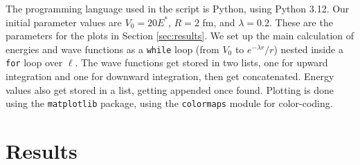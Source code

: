 \documentclass[%
 reprint,
nofootinbib,
 amsmath,amssymb,
 aps,
floatfix,
]{revtex4-2}
\begin{document}
{  The programming language used in the script is Python, using Python 3.12. 
  Our initial parameter values are $V_0 = 20E^*$, $R = 2$ fm, and $\lambda = 0.2$. 
  These are the parameters for the plots in Section \ref{sec:results}. 
  We set up the main calculation of energies and wave functions as a \texttt{while} loop (from $V_0$ to $e^{-\lambda r}/r$) nested inside a \texttt{for} loop over $\ell$. 
  The wave functions get stored in two lists, one for upward integration and one for downward integration, then get concatenated. 
  Energy values also get stored in a list, getting appended once found. 
  Plotting is done using the \texttt{matplotlib} package, using the \texttt{colormaps} module for color-coding. 
}



\section{\label{sec:results}Results}

\end{document}
